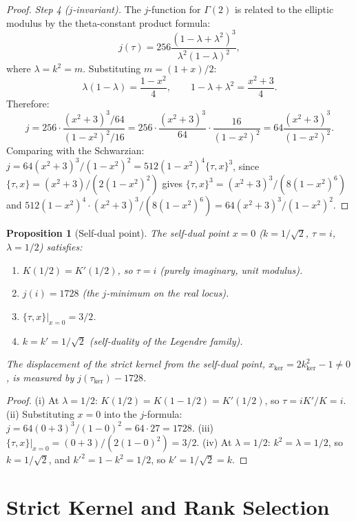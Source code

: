 \documentclass[12pt]{article}
\theoremstyle{plain}
\newtheorem{proposition}[theorem]{Proposition}
\theoremstyle{definition}
\numberwithin{equation}{section}
\newcommand{\kker}{\mathrm{ker}}
\begin{document}
\begin{proof}
\emph{Step 4 ($j$-invariant).}
The $j$-function for $\Gamma(2)$ is related to the elliptic modulus by the theta-constant product formula:
\begin{equation}
j(\tau) = 256\frac{(1-\lambda+\lambda^2)^3}{\lambda^2(1-\lambda)^2},
\end{equation}
where $\lambda=k^2=m$.  Substituting $m=(1+x)/2$:
\begin{equation}
\lambda(1-\lambda)=\frac{1-x^2}{4},\qquad 1-\lambda+\lambda^2=\frac{x^2+3}{4}.
\end{equation}
Therefore:
\begin{equation}
j = 256\cdot\frac{(x^2+3)^3/64}{(1-x^2)^2/16} = 256\cdot\frac{(x^2+3)^3}{64}\cdot\frac{16}{(1-x^2)^2} = 64\frac{(x^2+3)^3}{(1-x^2)^2}.
\end{equation}
Comparing with the Schwarzian: $j=64(x^2+3)^3/(1-x^2)^2=512(1-x^2)^4\{\tau,x\}^3$, since $\{\tau,x\}=(x^2+3)/(2(1-x^2)^2)$ gives $\{\tau,x\}^3=(x^2+3)^3/(8(1-x^2)^6)$ and $512(1-x^2)^4\cdot(x^2+3)^3/(8(1-x^2)^6)=64(x^2+3)^3/(1-x^2)^2$.
\end{proof}

\begin{proposition}[Self-dual point]\label{prop:selfdualpoint}
The self-dual point $x=0$ ($k=1/\sqrt{2}$, $\tau=i$, $\lambda=1/2$) satisfies:
\begin{enumerate}[label=(\roman*)]
\item $K(1/2)=K'(1/2)$, so $\tau=i$ (purely imaginary, unit modulus).
\item $j(i)=1728$ (the $j$-minimum on the real locus).
\item $\{\tau,x\}|_{x=0}=3/2$.
\item $k=k'=1/\sqrt{2}$ (self-duality of the Legendre family).
\end{enumerate}
The displacement of the strict kernel from the self-dual point, $x_{\kker}=2k_{\kker}^2-1\neq 0$, is measured by $j(\tau_{\kker})-1728$.
\end{proposition}

\begin{proof}
(i) At $\lambda=1/2$: $K(1/2)=K(1-1/2)=K'(1/2)$, so $\tau=iK'/K=i$.
(ii) Substituting $x=0$ into the $j$-formula: $j=64(0+3)^3/(1-0)^2=64\cdot 27=1728$.
(iii) $\{\tau,x\}|_{x=0}=(0+3)/(2(1-0)^2)=3/2$.
(iv) At $\lambda=1/2$: $k^2=\lambda=1/2$, so $k=1/\sqrt{2}$, and $k'^2=1-k^2=1/2$, so $k'=1/\sqrt{2}=k$.
\end{proof}

\section{Strict Kernel and Rank Selection}\label{sec:strictkernel}
\end{document}
